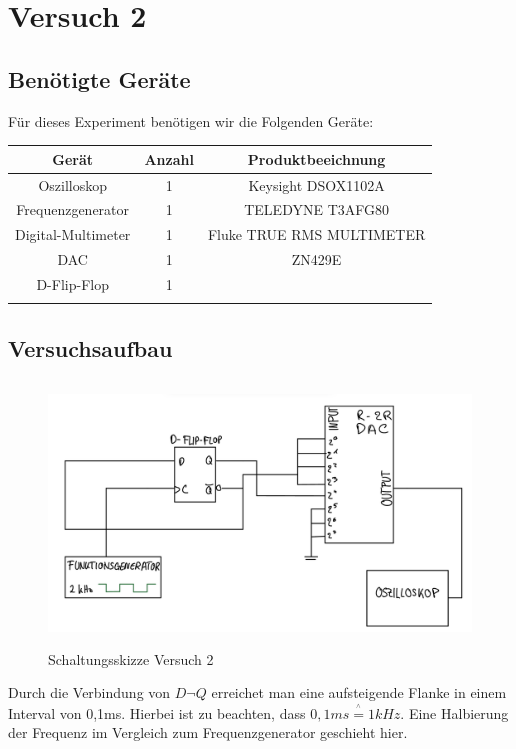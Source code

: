 \chapter{Versuch 2}

\section{Benötigte Geräte}

Für dieses Experiment benötigen wir die Folgenden Geräte:

\begin{tabular}[h]{c|c|c}
    Gerät & Anzahl & Produktbeeichnung\\
    \hline
    Oszilloskop & 1  & Keysight DSOX1102A\\
    \hline
    Frequenzgenerator & 1 & TELEDYNE T3AFG80\\
	\hline 
	Digital-Multimeter & 1 & Fluke TRUE RMS MULTIMETER\\
	\hline
	DAC & 1 & ZN429E \\
	\hline
	D-Flip-Flop & 1 & \\
	\hline
    \label{tab:Materialliste Versuch 2}
\end{tabular}


\section{Versuchsaufbau}
\label{sec:Versuchsaufbau}
\begin{figure}[H]
	\centering
	\includegraphics[height=7cm]{images/schaltungsskizze-versuch-zwei.jpeg} 
	\caption[]{Schaltungsskizze Versuch 2}
\end{figure}
Durch die Verbindung von $D\neg Q$ erreichet man eine aufsteigende Flanke
in einem Interval von 0,1ms. Hierbei ist zu beachten, dass $0,1ms \stackrel{^\wedge}{=} 1kHz$. 
Eine Halbierung der Frequenz im Vergleich zum Frequenzgenerator geschieht hier.

